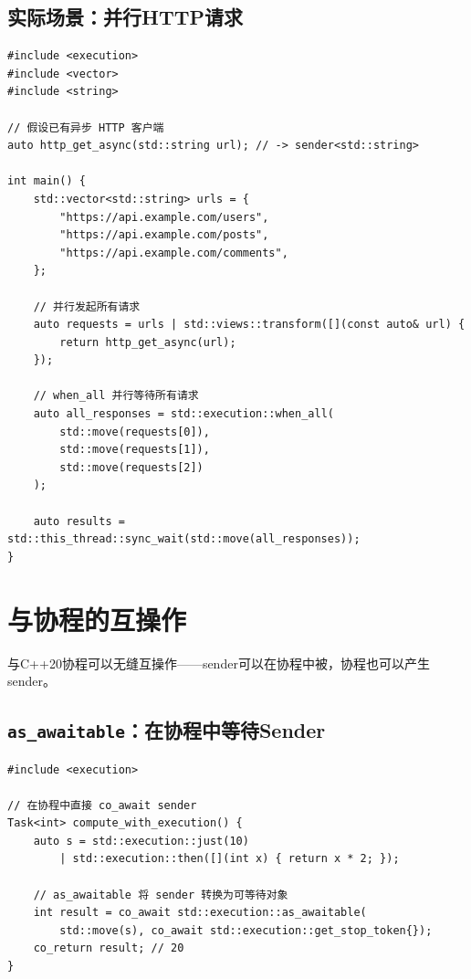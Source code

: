 \documentclass[12pt,a4paper,fontset=fandol]{ctexbook}
\newcommand{\cpp}[1]{C++#1}
\begin{document}
\section{实际场景：并行HTTP请求}

\begin{lstlisting}
#include <execution>
#include <vector>
#include <string>

// 假设已有异步 HTTP 客户端
auto http_get_async(std::string url); // -> sender<std::string>

int main() {
    std::vector<std::string> urls = {
        "https://api.example.com/users",
        "https://api.example.com/posts",
        "https://api.example.com/comments",
    };

    // 并行发起所有请求
    auto requests = urls | std::views::transform([](const auto& url) {
        return http_get_async(url);
    });

    // when_all 并行等待所有请求
    auto all_responses = std::execution::when_all(
        std::move(requests[0]),
        std::move(requests[1]),
        std::move(requests[2])
    );

    auto results = std::this_thread::sync_wait(std::move(all_responses));
}
\end{lstlisting}

\chapter{与协程的互操作}

\texttt{}与\cpp{}20协程可以无缝互操作——sender可以在协程中被\texttt{}，协程也可以产生sender。

\section{\texttt{as\_awaitable}：在协程中等待Sender}

\begin{lstlisting}
#include <execution>

// 在协程中直接 co_await sender
Task<int> compute_with_execution() {
    auto s = std::execution::just(10)
        | std::execution::then([](int x) { return x * 2; });

    // as_awaitable 将 sender 转换为可等待对象
    int result = co_await std::execution::as_awaitable(
        std::move(s), co_await std::execution::get_stop_token{});
    co_return result; // 20
}
\end{lstlisting}
\end{document}
